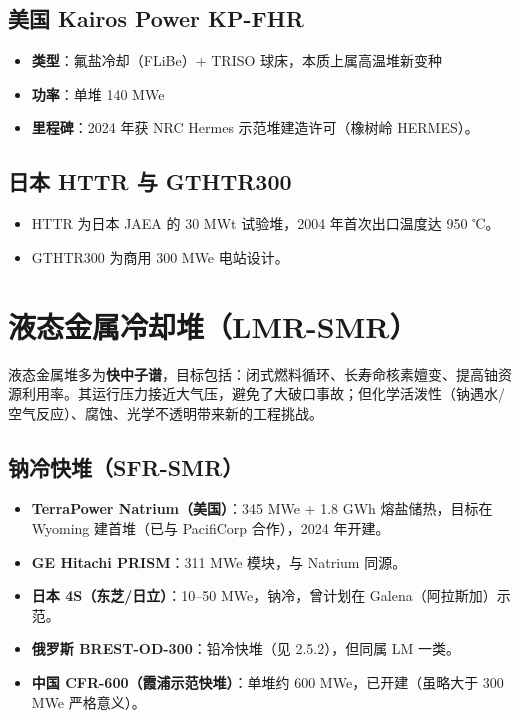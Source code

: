\documentclass[
  UTF8,
  scheme=plain,
  fontsize=10pt,
  openany
]{ctexbook}
\begin{document}
\subsection{美国 Kairos Power
KP-FHR}\label{ux7f8eux56fd-kairos-power-kp-fhr}

\begin{itemize}
\tightlist
\item
  \textbf{类型}：氟盐冷却（FLiBe）+ TRISO 球床，本质上属高温堆新变种
\item
  \textbf{功率}：单堆 140 MWe
\item
  \textbf{里程碑}：2024 年获 NRC Hermes 示范堆建造许可（橡树岭
  HERMES）。
\end{itemize}

\subsection{日本 HTTR 与
GTHTR300}\label{ux65e5ux672c-httr-ux4e0e-gthtr300}

\begin{itemize}
\tightlist
\item
  HTTR 为日本 JAEA 的 30 MWt 试验堆，2004 年首次出口温度达 950 ℃。
\item
  GTHTR300 为商用 300 MWe 电站设计。
\end{itemize}

\section{液态金属冷却堆（LMR-SMR）}\label{ux6db2ux6001ux91d1ux5c5eux51b7ux5374ux5806lmr-smr}

液态金属堆多为\textbf{快中子谱}，目标包括：闭式燃料循环、长寿命核素嬗变、提高铀资源利用率。其运行压力接近大气压，避免了大破口事故；但化学活泼性（钠遇水/空气反应）、腐蚀、光学不透明带来新的工程挑战。

\subsection{钠冷快堆（SFR-SMR）}\label{ux94a0ux51b7ux5febux5806sfr-smr}

\begin{itemize}
\tightlist
\item
  \textbf{TerraPower Natrium（美国）}：345 MWe + 1.8 GWh
  熔盐储热，目标在 Wyoming 建首堆（已与 PacifiCorp 合作），2024 年开建。
\item
  \textbf{GE Hitachi PRISM}：311 MWe 模块，与 Natrium 同源。
\item
  \textbf{日本 4S（东芝/日立）}：10--50 MWe，钠冷，曾计划在
  Galena（阿拉斯加）示范。
\item
  \textbf{俄罗斯 BREST-OD-300}：铅冷快堆（见 2.5.2），但同属 LM 一类。
\item
  \textbf{中国 CFR-600（霞浦示范快堆）}：单堆约 600
  MWe，已开建（虽略大于 300 MWe 严格意义）。
\end{itemize}
\end{document}
